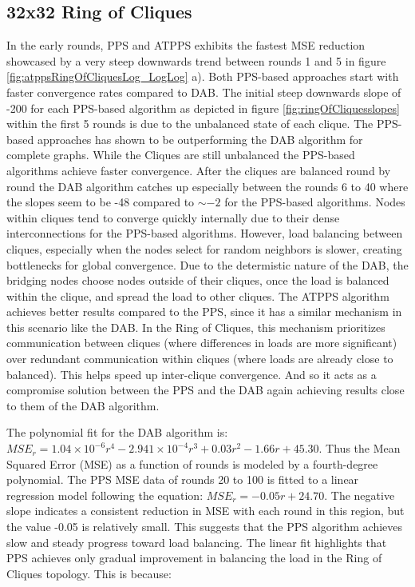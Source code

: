 \subsection{32x32 Ring of Cliques}\label{subsec:32_32ROC}
In the early rounds, PPS and ATPPS exhibits the fastest MSE reduction showcased by a very steep downwards trend between rounds 1 and 5 in figure \ref{fig:atppsRingOfCliquesLog_LogLog} a). Both PPS-based approaches start with faster convergence rates compared to DAB. The initial steep downwards slope of -200 for each PPS-based algorithm as depicted in figure \ref{fig:ringOfCliquesslopes} within the first 5 rounds is due to the unbalanced state of each clique. The PPS-based approaches has shown to be outperforming the DAB algorithm for complete graphs. While the Cliques are still unbalanced the PPS-based algorithms achieve faster convergence. After the cliques are balanced round by round the DAB algorithm catches up especially between the rounds 6 to 40 where the slopes seem to be -48 compared to $\sim-2$ for the PPS-based algorithms.  Nodes within cliques tend to converge quickly internally due to their dense interconnections for the PPS-based algorithms. However, load balancing between cliques, especially when the nodes select for random neighbors is slower, creating bottlenecks for global convergence. Due to the determistic nature of the DAB, the bridging nodes choose nodes outside of their cliques, once the load is balanced within the clique, and spread the load to other cliques. The ATPPS algorithm achieves better results compared to the PPS, since it has a similar mechanism in this scenario like the DAB. In the Ring of Cliques, this mechanism prioritizes communication between cliques (where differences in loads are more significant) over redundant communication within cliques (where loads are already close to balanced). This helps speed up inter-clique convergence. And so it acts as a compromise solution between the PPS and the DAB again achieving results close to them of the DAB algorithm.

The polynomial fit for the DAB algorithm is: $MSE_r=1.04\times 10^{-6}r^{4}-2.941\times 10^{-4}r^{3}+0.03r^{2}-1.66r+45.30$. Thus the Mean Squared Error (MSE) as a function of rounds is modeled by a fourth-degree polynomial. The PPS MSE data of rounds 20 to 100 is fitted to a linear regression model following the equation: $MSE_r=-0.05r+24.70$. The negative slope indicates a consistent reduction in MSE with each round in this region, but the value -0.05 is relatively small. This suggests that the PPS algorithm achieves slow and steady progress toward load balancing. The linear fit highlights that PPS achieves only gradual improvement in balancing the load in the Ring of Cliques topology. This is because:

